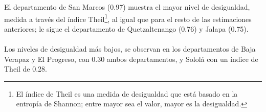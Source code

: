 El departamento de San Marcos (0.97) muestra el mayor nivel de desigualdad, medida a través del índice Theil\footnote{El índice de Theil es una medida de desigualdad que está basado en la entropía de Shannon; entre mayor sea el valor, mayor es la desigualdad.}, al igual que para el resto de las estimaciones anteriores;  le sigue el departamento de Quetzaltenango (0.76) y Jalapa (0.75). \\\\
 Los niveles de desigualdad más bajos, se observan en los departamentos de Baja Verapaz y El Progreso, con 0.30 ambos departamentos, y Sololá con un índice de Theil de 0.28.